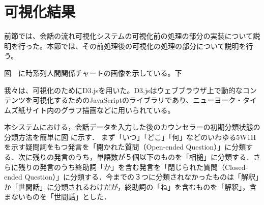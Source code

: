 \documentclass[shuuron]{kuee}
\begin{document}
\section{可視化結果}

前節では、会話の流れ可視化システムの可視化前の処理の部分の実装について説明を行った。本節では、その前処理後の可視化の処理の部分について説明を行う。



図　に時系列人間関係チャートの画像を示している。下


我々は、可視化のためにD3.js\cite{vand3}を用いた。D3.jsはウェブブラウザ上で動的なコンテンツを可視化するためのJavaScriptのライブラリであり、ニューヨーク・タイムズ紙サイト内のグラフ描画などに用いられている。



本システムにおける，会話データを入力した後のカウンセラーの初期分類状態の分類方法を簡単に図
に示す．
まず「いつ」「どこ」「何」などのいわゆる5W1Hを示す疑問詞をもつ発言を「開かれた質問（Open-ended Question）」に分類する．次に残りの発言のうち，単語数が５個以下のものを「相槌」に分類する．さらに残りの発言のうち終助詞「か」を含む発言を「閉じられた質問（Closed-ended Question）」に分類する．今までの３つに分類されなかったものは「解釈」か「世間話」に分類されるわけだが，終助詞の「ね」を含むものを「解釈」，含まないものを「世間話」とした．
\end{document}
